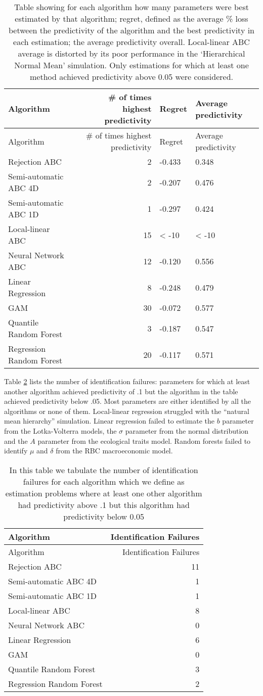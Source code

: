 \documentclass[]{article}
\begin{document}
\begin{longtable}[]{@{}lrll@{}}
\caption{\label{tab:predictiontable}Table showing for each algorithm how many parameters were best estimated by that algorithm; regret, defined as the average \% loss between the predictivity of the algorithm and the best predictivity in each estimation; the average predictivity overall. Local-linear ABC average is distorted by its poor performance in the `Hierarchical Normal Mean' simulation. Only estimations for which at least one method achieved predictivity above 0.05 were considered.}\tabularnewline
\toprule
Algorithm & \# of times highest predictivity & Regret & Average predictivity\tabularnewline
\midrule
\endfirsthead
\toprule
Algorithm & \# of times highest predictivity & Regret & Average predictivity\tabularnewline
\midrule
\endhead
Rejection ABC & 2 & -0.433 & 0.348\tabularnewline
Semi-automatic ABC 4D & 2 & -0.207 & 0.476\tabularnewline
Semi-automatic ABC 1D & 1 & -0.297 & 0.424\tabularnewline
Local-linear ABC & 15 & \textless{} -10 & \textless{} -10\tabularnewline
Neural Network ABC & 12 & -0.120 & 0.556\tabularnewline
Linear Regression & 8 & -0.248 & 0.479\tabularnewline
GAM & 30 & -0.072 & 0.577\tabularnewline
Quantile Random Forest & 3 & -0.187 & 0.547\tabularnewline
Regression Random Forest & 20 & -0.117 & 0.571\tabularnewline
\bottomrule
\end{longtable}

Table \ref{tab:failuretable} lists the number of identification failures: parameters for which at least another algorithm achieved predictivity of .1 but the algorithm in the table achieved predictivity below .05.
Most parameters are either identified by all the algorithms or none of them.
Local-linear regression struggled with the ``natural mean hierarchy'' simulation.
Linear regression failed to estimate the \(b\) parameter from the Lotka-Volterra models, the \(\sigma\) parameter from the normal distribution and the \(A\) parameter from the ecological traits model.
Random forests failed to identify \(\mu\) and \(\delta\) from the RBC macroeconomic model.

\begin{longtable}[]{@{}lr@{}}
\caption{\label{tab:failuretable}In this table we tabulate the number of identification failures for each algorithm which we define as estimation problems where at least one other algorithm had predictivity above .1 but this algorithm had predictivity below 0.05}\tabularnewline
\toprule
Algorithm & Identification Failures\tabularnewline
\midrule
\endfirsthead
\toprule
Algorithm & Identification Failures\tabularnewline
\midrule
\endhead
Rejection ABC & 11\tabularnewline
Semi-automatic ABC 4D & 1\tabularnewline
Semi-automatic ABC 1D & 1\tabularnewline
Local-linear ABC & 8\tabularnewline
Neural Network ABC & 0\tabularnewline
Linear Regression & 6\tabularnewline
GAM & 0\tabularnewline
Quantile Random Forest & 3\tabularnewline
Regression Random Forest & 2\tabularnewline
\bottomrule
\end{longtable}
\end{document}
